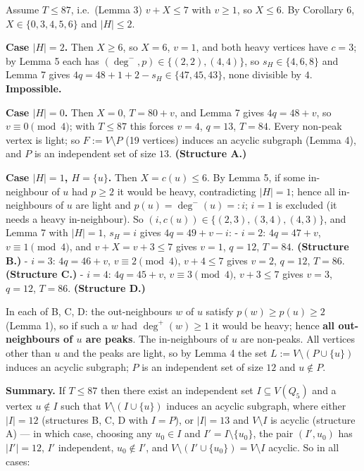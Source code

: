\documentclass[11pt,a4paper]{article}
\begin{document}
Assume \(T\le87\), i.e.~(Lemma 3) \(v+X\le7\) with \(v\ge1\), so
\(X\le6\). By Corollary 6, \(X\in\{0,3,4,5,6\}\) and \(|H|\le2\).

\textbf{Case \(|H|=2\).} Then \(X\ge6\), so \(X=6\), \(v=1\), and both
heavy vertices have \(c=3\); by Lemma 5 each has
\((\deg^-,p)\in\{(2,2),(4,4)\}\), so \(s_H\in\{4,6,8\}\) and Lemma 7
gives \(4q=48+1+2-s_H\in\{47,45,43\}\), none divisible by \(4\).
\textbf{Impossible.}

\textbf{Case \(|H|=0\).} Then \(X=0\), \(T=80+v\), and Lemma 7 gives
\(4q=48+v\), so \(v\equiv0\pmod 4\); with \(T\le87\) this forces
\(v=4\), \(q=13\), \(T=84\). Every non-peak vertex is light; so
\(F:=V\setminus P\) (19 vertices) induces an acyclic subgraph (Lemma 4),
and \(P\) is an independent set of size \(13\). \textbf{(Structure A.)}

\textbf{Case \(|H|=1\), \(H=\{u\}\).} Then \(X=c(u)\le6\). By Lemma 5,
if some in-neighbour of \(u\) had \(p\ge2\) it would be heavy,
contradicting \(|H|=1\); hence all in-neighbours of \(u\) are light and
\(p(u)=\deg^-(u)=:i\); \(i=1\) is excluded (it needs a heavy
in-neighbour). So \((i,c(u))\in\{(2,3),(3,4),(4,3)\}\), and Lemma 7 with
\(|H|=1\), \(s_H=i\) gives \(4q=49+v-i\): - \(i=2\): \(4q=47+v\),
\(v\equiv1\pmod4\), and \(v+X=v+3\le7\) gives \(v=1\), \(q=12\),
\(T=84\). \textbf{(Structure B.)} - \(i=3\): \(4q=46+v\),
\(v\equiv2\pmod4\), \(v+4\le7\) gives \(v=2\), \(q=12\), \(T=86\).
\textbf{(Structure C.)} - \(i=4\): \(4q=45+v\), \(v\equiv3\pmod4\),
\(v+3\le7\) gives \(v=3\), \(q=12\), \(T=86\). \textbf{(Structure D.)}

In each of B, C, D: the out-neighbours \(w\) of \(u\) satisfy
\(p(w)\ge p(u)\ge2\) (Lemma 1), so if such a \(w\) had \(\deg^+(w)\ge1\)
it would be heavy; hence \textbf{all out-neighbours of \(u\) are peaks}.
The in-neighbours of \(u\) are non-peaks. All vertices other than \(u\)
and the peaks are light, so by Lemma 4 the set
\(L:=V\setminus(P\cup\{u\})\) induces an acyclic subgraph; \(P\) is an
independent set of size \(12\) and \(u\notin P\).

\textbf{Summary.} If \(T\le 87\) then there exist an independent set
\(I\subseteq V(Q_5)\) and a vertex \(u\notin I\) such that
\(V\setminus(I\cup\{u\})\) induces an acyclic subgraph, where either
\(|I|=12\) (structures B, C, D with \(I=P\)), or \(|I|=13\) and
\(V\setminus I\) is acyclic (structure A) --- in which case, choosing
any \(u_0\in I\) and \(I'=I\setminus\{u_0\}\), the pair \((I',u_0)\) has
\(|I'|=12\), \(I'\) independent, \(u_0\notin I'\), and
\(V\setminus(I'\cup\{u_0\})=V\setminus I\) acyclic. So in all cases:
\end{document}
